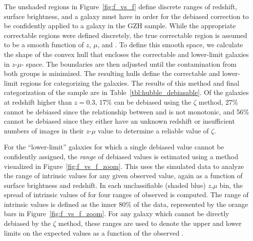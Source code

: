 \documentclass[twocolumn]{aastex6}
\begin{document}
The unshaded regions in Figure~\ref{fig:f_vs_f} define discrete ranges of redshift,
surface brightness, and \ffeatures{} a galaxy must have in order for the
debiased correction to be confidently applied to a galaxy in the GZH sample.
While the appropriate correctable regions were defined discretely, the true
correctable region is assumed to be a smooth function of $z$, $\mu$, and
\ffeatures{}. To define this smooth space, we calculate the shape of the convex
hull that encloses the correctable and lower-limit \ferengi{} galaxies in
$z$-$\mu$-\ffeatures{} space. The boundaries are then adjusted until the
contamination from both groups is minimized. The resulting hulls define the
correctable and lower-limit regions for categorizing the \hst{} galaxies. The
results of this method and final categorization of the \hst{} sample are in
Table~\ref{tbl:hubble_debiasable}. Of the galaxies at redshift higher than
$z=0.3$, 17\% can be debiased using the $\zeta$ method, 27\% cannot be debiased
since the relationship between \ffeaturesz{} and \ffeaturesrest{} is not
monotonic, and 56\% cannot be debiased since they either have an unknown
redshift or insufficient numbers of \ferengi{} images in their $z$-$\mu$ value
to determine a reliable value of $\zeta$.

For the ``lower-limit'' galaxies for which a single debiased \ffeatures{} value
cannot be confidently assigned, the \emph{range} of debiased values is
estimated using a method visualized in Figure~\ref{fig:f_vs_f_zoom}. This uses the
\ferengi{} simulated data to analyze the range of intrinsic \ffeaturesrest{}
values for any given observed \ffeatures{} value, again as a function of
surface brightness and redshift. In each unclassifiable (shaded blue) $z$,$\mu$ bin, the spread of
intrinsic values of \ffeaturesrest{} for four ranges of observed \ffeatures is computed.
The range of intrinsic values is defined as the inner 80\% of the data,
represented by the orange bars in Figure~\ref{fig:f_vs_f_zoom}. For any galaxy which
cannot be directly debiased by the $\zeta$ method, these ranges are used to
denote the upper and lower limits on the expected values \ffeaturesrest{} as a
function of the observed \ffeatures. 
\end{document}
